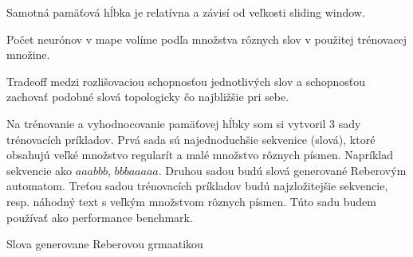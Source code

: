 Samotná pamäťová hĺbka je relatívna a závisí od veľkosti sliding window.

Počet neurónov v mape volíme podľa množstva rôznych slov v použitej trénovacej
množine.

Tradeoff medzi rozlišovaciou schopnosťou jednotlivých slov a schopnosťou
zachovať podobné slová topologicky čo najbližšie pri sebe.

Na trénovanie a vyhodnocovanie pamäťovej hĺbky som si vytvoril 3 sady 
trénovacích príkladov. 
Prvá sada sú najednoduchšie sekvenice (slová), ktoré obsahujú veľké množstvo regularít a malé množstvo rôznych písmen.
Napríklad sekvencie ako $aaabbb$,  $bbbaaaaa$.
Druhou sadou budú slová generované Reberovým automatom.
Treťou sadou trénovacích príkladov budú najzložitejšie sekvencie, resp. náhodný text s
veľkým množstvom rôznych písmen. Túto sadu budem používať ako performance benchmark. 

Slova generovane Reberovou grmaatikou


